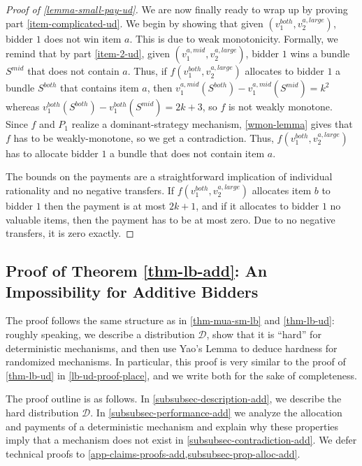 \begin{proof}[Proof of \cref{lemma-small-pay-ud}]
We are now finally ready to wrap up by proving part \ref{item-complicated-ud}. We begin by showing that given $(v_1^{both},v_2^{a,large})$, bidder $1$ does not win item $a$. This is due to weak monotonicity. Formally, we remind that by part \ref{item-2-ud}, given $(v_1^{a,mid},v_2^{a,large})$, bidder $1$ wins a bundle $S^{mid}$
that does not contain $a$. Thus, if $f(v_1^{both},v_2^{a,large})$ allocates to bidder $1$ 
a bundle $S^{both}$ that contains item $a$, then $v_1^{a,mid}(S^{both})-v_1^{a,mid}(S^{mid})=k^2$ whereas $v_1^{both}(S^{both})-v_1^{both}(S^{mid})=2k+3$, so $f$ is not weakly monotone. Since $f$ and $P_1$ realize a dominant-strategy mechanism, \cref{wmon-lemma} gives that $f$ has to be weakly-monotone, so we get a contradiction. Thus, $f(v_1^{both},v_2^{a,large})$ has to allocate bidder $1$ a bundle that does not contain item $a$. 

The bounds on the payments are a straightforward implication of individual rationality and no negative transfers. If $f(v_1^{both},v_2^{a,large})$ allocates item $b$ to bidder $1$ then the payment is at most $2k+1$, and if it allocates to bidder $1$ no valuable items, then the payment has to be at most zero. Due to no negative transfers, it is zero exactly.   
\end{proof}

\subsection{Proof of Theorem \ref{thm-lb-add}: An Impossibility for Additive Bidders} \label{lb-add-proof-place}
The proof follows the same structure as in \cref{thm-mua-sm-lb} and \cref{thm-lb-ud}: roughly speaking, we describe a distribution $\mathcal{D}$, show that it is “hard” for deterministic mechanisms, and then use Yao's Lemma to deduce hardness for randomized mechanisms. In particular, this proof is very similar to the proof of \cref{thm-lb-ud} in \cref{lb-ud-proof-place}, and we write both for the sake of completeness. 

The proof outline is as follows. In \cref{subsubsec-description-add}, 
we describe the  hard distribution $\mathcal D$. 
In \cref{subsubsec-performance-add} we analyze the allocation and payments of a deterministic  mechanism 
and explain why these properties  imply that  a  mechanism does not exist in  \cref{subsubsec-contradiction-add}.
We defer technical proofs to \cref{app-claims-proofs-add,subsubsec-prop-alloc-add}. 

